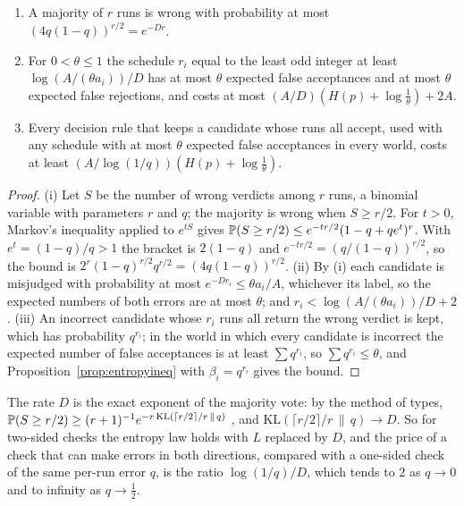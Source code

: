 \begin{proposition}\label{prop:twosided}
\begin{enumerate}[label=\textup{(\roman*)},leftmargin=2.2em,itemsep=1pt]
\item A majority of $r$ runs is wrong with probability at most $(4q(1-q))^{r/2}=e^{-Dr}$.
\item For $0<\theta\le1$ the schedule $r_{i}$ equal to the least odd integer at least $\log(A/(\theta a_{i}))/D$ has at most $\theta$ expected false acceptances and at most $\theta$ expected false rejections, and costs at most $(A/D)(H(p)+\log\frac1\theta)+2A$.
\item Every decision rule that keeps a candidate whose runs all accept, used with any schedule with at most $\theta$ expected false acceptances in every world, costs at least $(A/\log(1/q))(H(p)+\log\frac1\theta)$.
\end{enumerate}
\end{proposition}

\begin{proof}
(i) Let $S$ be the number of wrong verdicts among $r$ runs, a binomial variable with parameters $r$ and $q$; the majority is wrong when $S\ge r/2$. For $t>0$, Markov's inequality applied to $e^{tS}$ gives $\mathbb{P}(S\ge r/2)\le e^{-tr/2}(1-q+qe^{t})^{r}$. With $e^{t}=(1-q)/q>1$ the bracket is $2(1-q)$ and $e^{-tr/2}=(q/(1-q))^{r/2}$, so the bound is $2^{r}(1-q)^{r/2}q^{r/2}=(4q(1-q))^{r/2}$.
(ii) By (i) each candidate is misjudged with probability at most $e^{-Dr_{i}}\le\theta a_{i}/A$, whichever its label, so the expected numbers of both errors are at most $\theta$; and $r_{i}<\log(A/(\theta a_{i}))/D+2$.
(iii) An incorrect candidate whose $r_{i}$ runs all return the wrong verdict is kept, which has probability $q^{r_{i}}$; in the world in which every candidate is incorrect the expected number of false acceptances is at least $\sum q^{r_{i}}$, so $\sum q^{r_{i}}\le\theta$, and Proposition~\ref{prop:entropyineq} with $\beta_{i}=q^{r_{i}}$ gives the bound.
\end{proof}

The rate $D$ is the exact exponent of the majority vote: by the method of types, $\mathbb{P}(S\ge r/2)\ge(r+1)^{-1}e^{-r\,\mathrm{KL}(\lceil r/2\rceil/r\,\|\,q)}$ \cite{CT06}, and $\mathrm{KL}(\lceil r/2\rceil/r\,\|\,q)\to D$. So for two-sided checks the entropy law holds with $L$ replaced by $D$, and the price of a check that can make errors in both directions, compared with a one-sided check of the same per-run error $q$, is the ratio $\log(1/q)/D$, which tends to $2$ as $q\to0$ and to infinity as $q\to\frac12$.
